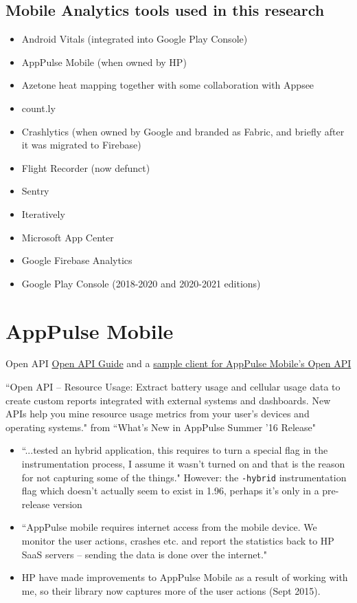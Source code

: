 \subsection{Mobile Analytics tools used in this research}
\begin{itemize}
    \item Android Vitals (integrated into Google Play Console)
    \item AppPulse Mobile (when owned by HP)
    \item Azetone heat mapping together with some collaboration with Appsee
    \item count.ly
    \item Crashlytics (when owned by Google and branded as Fabric, and briefly after it was migrated to Firebase)
    \item Flight Recorder (now defunct)
    \item Sentry
    \item Iteratively
    \item Microsoft App Center
    \item Google Firebase Analytics
    \item Google Play Console (2018-2020 and 2020-2021 editions)
\end{itemize}


\section{AppPulse Mobile}

Open API \href{https://github.com/MicroFocus/apmobile-openapiclient/blob/master/doc/AppPulse_Mobile_Open_API_Guide.pdf}{Open API Guide} and a  \href{https://github.com/MicroFocus/apmobile-openapiclient}{sample client for AppPulse Mobile's Open API}

``Open API – Resource Usage: Extract battery usage and cellular usage data to create custom reports integrated with external systems and dashboards. New APIs help you mine resource usage metrics from your user’s devices and operating systems." from ``What's New in AppPulse Summer '16 Release"

\begin{itemize}
    \item ``...tested an hybrid application, this requires to turn a special flag in the instrumentation process, I assume it wasn’t turned on and that is the reason for not capturing some of the things." However: the \texttt{-hybrid} instrumentation flag which doesn't actually seem to exist in 1.96, perhaps it's only in a pre-release version
    \item ``AppPulse mobile requires internet access from the mobile device. We monitor the user actions, crashes etc. and report the statistics back to HP SaaS servers – sending the data is done over the internet."
    \item HP have made improvements to AppPulse Mobile as a result of working with me, so their library now captures more of the user actions (Sept 2015).
\end{itemize}

